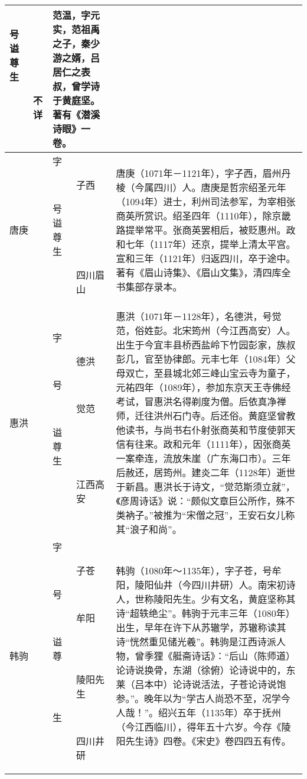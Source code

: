 \begin{longtable}{|>{\centering\namefont\heiti}m{2em}|>{\centering\tiny}m{3.0em}|>{\xzfont\kaiti}m{7em}|}
\begin{description}
  \item[号] 
  \item[谥] 
  \item[尊] 
  \item[生] 不详
  \end{description} & 范温，字元实，范祖禹之子，秦少游之婿，吕居仁之表叔，曾学诗于黄庭坚。著有《潜溪诗眼》一卷。 \tabularnewline\hline
  唐庚 & \begin{description}
  \item[字] 子西
  \item[号] 
  \item[谥] 
  \item[尊] 
  \item[生] 四川眉山
  \end{description} & 唐庚（1071年－1121年），字子西，眉州丹棱（今属四川）人。唐庚是哲宗绍圣元年（1094年）进士，利州司法参军，为宰相张商英所赏识。绍圣四年（1110年），除京畿路提举常平。张商英罢相后，被贬惠州。政和七年（1117年）还京，提举上清太平宫。宣和三年（1121年）归返四川，卒于途中。著有《眉山诗集》、《眉山文集》，清四库全书集部存录本。 \tabularnewline\hline
  惠洪 & \begin{description}
  \item[字] 德洪
  \item[号] 觉范
  \item[谥] 
  \item[尊] 
  \item[生] 江西高安
  \end{description} & 惠洪（1071年－1128年），名德洪，号觉范，俗姓彭。北宋筠州（今江西高安）人。出生于今宜丰县桥西盐岭下竹园彭家，族叔彭几，官至协律郎。元丰七年（1084年）父母双亡，至县城北郊三峰山宝云寺为童子，元祐四年（1089年），参加东京天王寺佛经考试，冒惠洪名得剃度为僧。后依真净禅师，迁往洪州石门寺。后还俗。黄庭坚曾教他读书，与尚书右仆射张商英和节度使郭天信有往来。政和元年（1111年），因张商英一案牵连，流放朱崖（广东海口市）。三年后赦还，居筠州。建炎二年（1128年）逝世于新昌。惠洪长于诗文，“觉范斯须立就”，《彦周诗话》说：“颇似文章巨公所作，殊不类衲子。”被推为“宋僧之冠”，王安石女儿称其“浪子和尚”。 \tabularnewline\hline
  韩驹 & \begin{description}
  \item[字] 子苍
  \item[号] 牟阳
  \item[谥] 
  \item[尊] 陵阳先生
  \item[生] 四川井研
  \end{description} & 韩驹（1080年～1135年），字子苍，号牟阳，陵阳仙井（今四川井研）人。南宋初诗人，世称陵阳先生。少有文名，黄庭坚称其诗“超轶绝尘”。韩驹于元丰三年（1080年）出生，早年在许下从苏辙学，苏辙称读其诗“恍然重见储光羲”。韩驹是江西诗派人物，曾季狸《艇斋诗话》：“后山（陈师道）论诗说换骨，东湖（徐俯）论诗说中的，东莱（吕本中）论诗说活法，子苍论诗说饱参。”。晚年以为“学古人尚恐不至，况学今人哉！”。绍兴五年（1135年）卒于抚州（今江西临川），得年五十六岁。今存《陵阳先生诗》四卷。《宋史》卷四四五有传。 \tabularnewline\hline

\end{longtable}
